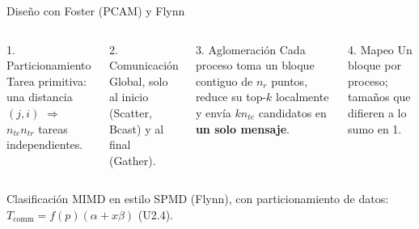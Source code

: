 \documentclass[aspectratio=169,10pt]{beamer}
\newcommand{\ntr}{n_{tr}}
\newcommand{\nte}{n_{te}}
\newcommand{\tsub}[1]{T_{\mathrm{#1}}}
\renewenvironment{block}[1]{\begin{caja}[cajagris]{#1}}{\end{caja}}
\renewenvironment{exampleblock}[1]{\begin{caja}[cajaverde]{#1}}{\end{caja}}
\begin{document}
\begin{frame}{Diseño con Foster (PCAM) y Flynn}
\begin{columns}[T]
\begin{block}{1. Particionamiento}
Tarea primitiva: una distancia $(j,i)$ $\Rightarrow$ $\nte\ntr$ tareas independientes.
\end{block}
\begin{block}{2. Comunicación}
Global, solo al inicio (Scatter, Bcast) y al final (Gather).
\end{block}
\begin{block}{3. Aglomeración}
Cada proceso toma un bloque contiguo de $n_r$ puntos, reduce su top-$k$ localmente y envía $k\nte$ candidatos en \textbf{un solo mensaje}.
\end{block}
\begin{block}{4. Mapeo}
Un bloque por proceso; tamaños que difieren a lo sumo en 1.
\end{block}
\end{columns}
\vspace{4pt}
\begin{exampleblock}{Clasificación}
MIMD en estilo SPMD (Flynn), con particionamiento de datos: $\tsub{comm}=f(p)(\alpha+x\beta)$ (U2.4).
\end{exampleblock}
\end{frame}
\end{document}
